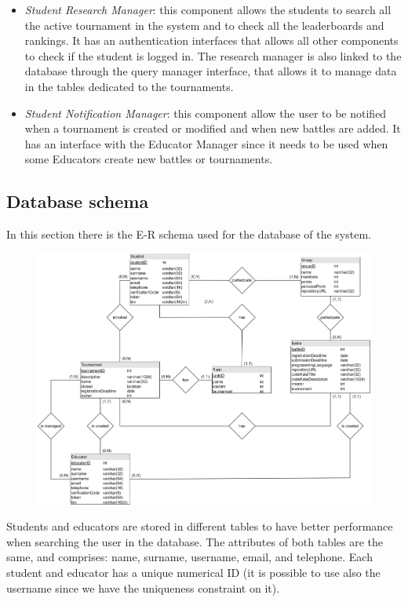 \documentclass[12pt, a4paper]{report}
\begin{document}
\begin{itemize}
        \item \textit{Student Research Manager}: this component allows the students to search all the active tournament in the system and to check all the leaderboards and rankings. 
            It has an authentication interfaces that allows all other components to check if the student is logged in.
            The research manager is also linked to the database through the query manager interface, that allows it to manage data in the tables dedicated to the tournaments.
        \item \textit{Student Notification Manager}: this component allow the user to be notified when a tournament is created or modified and when new battles are added. 
            It has an interface with the Educator Manager since it needs to be used when some Educators create new battles or tournaments.
    \end{itemize}

    \newpage
    \subsection{Database schema}
    In this section there is the E-R schema used for the database of the system. 
    \begin{figure}[H]
        \centering
        \includegraphics[width=0.9\linewidth]{images/db.png}
    \end{figure}
    Students and educators are stored in different tables to have better performance when searching the user in the database.
    The attributes of both tables are the same, and comprises: name, surname, username, email, and telephone. 
    Each student and educator has a unique numerical ID (it is possible to use also the username since we have the uniqueness constraint on it). 
\end{document}
